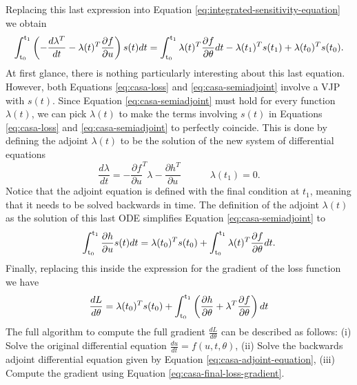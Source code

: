 Replacing this last expression into Equation \eqref{eq:integrated-sensitivity-equation} we obtain 
\begin{equation}
    \operatorname{\int_{t_0}^{t_1}} \left( - \frac{d\lambda^T}{dt} -  \lambda(t)^T \frac{\partial f}{\partial u} \right) s(t) dt
    =
    \operatorname{\int_{t_0}^{t_1}} \lambda(t)^T \frac{\partial f}{\partial \theta} dt 
    - 
    \lambda(t_1)^T s(t_1)
    + 
    \lambda(t_0)^T s(t_0).
    \label{eq:casa-semiadjoint}
\end{equation}
At first glance, there is nothing particularly interesting about this last equation. 
However, both Equations \eqref{eq:casa-loss} and \eqref{eq:casa-semiadjoint} involve a VJP with $s(t)$. 
Since Equation \eqref{eq:casa-semiadjoint} must hold for every function $\lambda(t)$, we can pick $\lambda(t)$ to make the terms involving $s(t)$ in Equations \eqref{eq:casa-loss} and \eqref{eq:casa-semiadjoint} to perfectly coincide. 
This is done by defining the adjoint $\lambda(t)$ to be the solution of the new system of differential equations
\begin{equation}
    \frac{d\lambda}{dt} 
    = 
    - 
    \frac{\partial f}{\partial u}^T \lambda  
    - 
    \frac{\partial h^T}{\partial u} 
    \qquad \quad \lambda(t_1) = 0. 
    \label{eq:casa-adjoint-equation}
\end{equation}
Notice that the adjoint equation is defined with the final condition at $t_1$, meaning that it needs to be solved backwards in time. 
The definition of the adjoint $\lambda(t)$ as the solution of this last ODE simplifies Equation \eqref{eq:casa-semiadjoint} to
\begin{equation}
    \operatorname{\int_{t_0}^{t_1}} \frac{\partial h}{\partial u} s(t) dt
    = 
    \lambda(t_0)^T s(t_0)
    + 
    \operatorname{\int_{t_0}^{t_1}} \lambda(t)^T \frac{\partial f}{\partial \theta} dt.
\end{equation}
Finally, replacing this inside the expression for the gradient of the loss function we have 
\begin{equation}
    \frac{dL}{d\theta}
    = 
    \lambda(t_0)^T s(t_0)
    + 
    \operatorname{\int_{t_0}^{t_1}}
    \left( \frac{\partial h}{\partial \theta} + \lambda^T \frac{\partial f}{\partial \theta} \right) dt
    \label{eq:casa-final-loss-gradient}
\end{equation}
The full algorithm to compute the full gradient $\frac{dL}{d\theta}$ can be described as follows: (i) Solve the original differential equation $\frac{du}{dt} = f(u, t, \theta)$, (ii) Solve the backwards adjoint differential equation given by Equation \eqref{eq:casa-adjoint-equation}, (iii) Compute the gradient using Equation \eqref{eq:casa-final-loss-gradient}.



